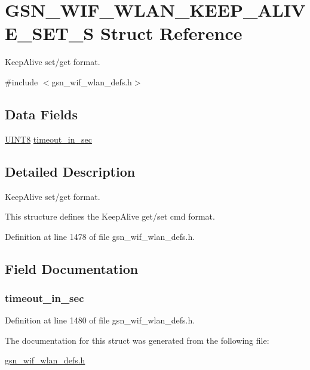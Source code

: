 \hypertarget{a00385}{
\section{GSN\_\-WIF\_\-WLAN\_\-KEEP\_\-ALIVE\_\-SET\_\-S Struct Reference}
\label{a00385}
}


KeepAlive set/get format.  




{\ttfamily \#include $<$gsn\_\-wif\_\-wlan\_\-defs.h$>$}

\subsection*{Data Fields}
\begin{DoxyCompactItemize}
\item 
\hyperlink{a00660_gab27e9918b538ce9d8ca692479b375b6a}{UINT8} \hyperlink{a00385_aea888bafd9fe3bb3abd09dc1cdc07c3f}{timeout\_\-in\_\-sec}
\end{DoxyCompactItemize}


\subsection{Detailed Description}
KeepAlive set/get format. 

This structure defines the KeepAlive get/set cmd format. 

Definition at line 1478 of file gsn\_\-wif\_\-wlan\_\-defs.h.



\subsection{Field Documentation}
\hypertarget{a00385_aea888bafd9fe3bb3abd09dc1cdc07c3f}{
\subsubsection[{timeout\_\-in\_\-sec}]{ {\bf timeout\_\-in\_\-sec}}}
\label{a00385_aea888bafd9fe3bb3abd09dc1cdc07c3f}


Definition at line 1480 of file gsn\_\-wif\_\-wlan\_\-defs.h.



The documentation for this struct was generated from the following file:\begin{DoxyCompactItemize}
\item 
\hyperlink{a00613}{gsn\_\-wif\_\-wlan\_\-defs.h}\end{DoxyCompactItemize}
